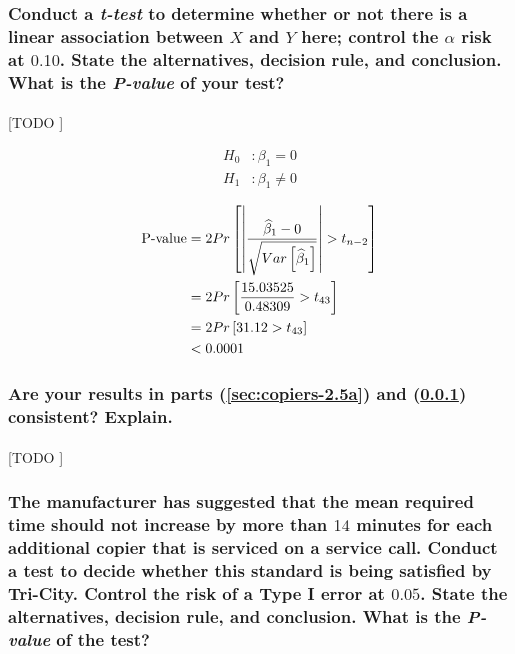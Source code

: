\documentclass{article}
\begin{document}
      \subsubsection{Conduct a \emph{t-test} to determine whether or not there is a linear association between $X$ and $Y$ here; control the $\alpha$ risk at $0.10$. State the alternatives, decision rule, and conclusion. What is the \emph{P-value} of your test?}
      \label{sec:copiers-2.5b}

        \paragraph{}
        [TODO ]

        \begin{equation}
          \begin{split}
            H_0&: \beta_1 = 0 \\
            H_1&: \beta_1 \neq 0
          \end{split}
        \end{equation}

        \begin{equation}
          \begin{split}
            \text{P-value} &= 2Pr\left[\left|\frac{\widehat{\beta}_1 - 0}{\sqrt{Var\left[\widehat{\beta}_1\right]}}\right| > t_{n-2}\right] \\
            &= 2Pr\left[\frac{15.03525}{0.48309} > t_{43}\right] \\
            &= 2Pr\left[31.12 > t_{43}\right] \\
            &< 0.0001
          \end{split}
        \end{equation}


      \subsubsection{Are your results in parts (\ref{sec:copiers-2.5a}) and (\ref{sec:copiers-2.5b}) consistent? Explain.}

        \paragraph{}
        [TODO ]

      \subsubsection{The manufacturer has suggested that the mean required time should not increase by more
than $14$ minutes for each additional copier that is serviced on a service call. Conduct a test to decide whether this standard is being satisfied by Tri-City. Control the risk of a Type I error at $0.05$. State the alternatives, decision rule, and conclusion. What is the \emph{P-value} of the test?}
\end{document}
